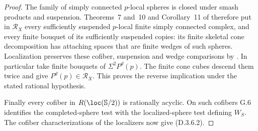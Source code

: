 \begin{proof}
The family of simply connected $p$-local spheres is
closed under smash products and suspension. Theorems~7
and~10 and Corollary~11 of \cite{I_Strom2012} therefore
put in $\mathcal R_X$ every sufficiently suspended
$p$-local finite simply connected complex, and every
finite bouquet of its sufficiently suspended copies:
its finite skeletal cone decomposition has attaching
spaces that are finite wedges of such spheres.
Localization preserves these cofiber, suspension and
wedge comparisons by
\cite[Propositions~6.4.1--6.4.6]{FGHMayPonto2012}.
In particular take finite bouquets of $\Sigma^2P^d(p)$.
The finite cone cubes descend them twice and give
$P^d(p)\in\mathcal R_X$.
This proves the reverse implication under the stated
rational hypothesis.

Finally every cofiber in $R(\loc(\mathbb S/2))$ is
rationally acyclic. On such cofibers G.6 identifies the
completed-sphere test with the localized-sphere test
defining $W_S$. The cofiber characterizations of the
localizers now give (D.3.6.2).
\end{proof}
